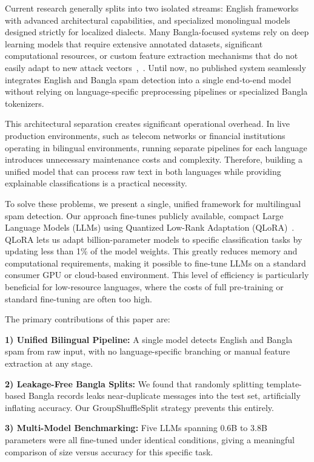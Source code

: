 \documentclass[journal]{IEEEtran}
\begin{document}
Current research generally splits into two isolated streams: English frameworks with advanced architectural capabilities, and specialized monolingual models designed strictly for localized dialects. Many Bangla-focused systems rely on deep learning models that require extensive annotated datasets, significant computational resources, or custom feature extraction mechanisms that do not easily adapt to new attack vectors~\cite{ref7},~\cite{ref10}. Until now, no published system seamlessly integrates English and Bangla spam detection into a single end-to-end model without relying on language-specific preprocessing pipelines or specialized Bangla tokenizers.

This architectural separation creates significant operational overhead. In live production environments, such as telecom networks or financial institutions operating in bilingual environments, running separate pipelines for each language introduces unnecessary maintenance costs and complexity. Therefore, building a unified model that can process raw text in both languages while providing explainable classifications is a practical necessity.

To solve these problems, we present a single, unified framework for multilingual spam detection. Our approach fine-tunes publicly available, compact Large Language Models (LLMs) using Quantized Low-Rank Adaptation (QLoRA)~\cite{ref11}. QLoRA lets us adapt billion-parameter models to specific classification tasks by updating less than 1\% of the model weights. This greatly reduces memory and computational requirements, making it possible to fine-tune LLMs on a standard consumer GPU or cloud-based environment. This level of efficiency is particularly beneficial for low-resource languages, where the costs of full pre-training or standard fine-tuning are often too high.

The primary contributions of this paper are:

\textbf{1) Unified Bilingual Pipeline:} A single model detects English and Bangla spam from raw input, with no language-specific branching or manual feature extraction at any stage.

\textbf{2) Leakage-Free Bangla Splits:} We found that randomly splitting template-based Bangla records leaks near-duplicate messages into the test set, artificially inflating accuracy. Our GroupShuffleSplit strategy prevents this entirely.

\textbf{3) Multi-Model Benchmarking:} Five LLMs spanning 0.6B to 3.8B parameters were all fine-tuned under identical conditions, giving a meaningful comparison of size versus accuracy for this specific task.
\end{document}
